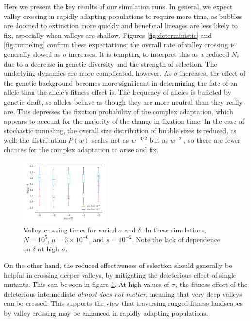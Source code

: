 \documentclass[rmp]{revtex4}
\begin{document}
\begin{spacing}{1.5}
Here we present the key results of our simulation runs.
In general, we expect valley crossing in rapidly adapting populations to require more time, as bubbles are doomed to extinction more quickly and beneficial lineages are less likely to fix, especially when valleys are shallow.
Figures \ref{fig:deterministic} and \ref{fig:tunneling} confirm these expectations: the overall rate of valley crossing is generally slowed as $\sigma$ increases.
It is tempting to interpret this as a reduced $N_e$ due to a decrease in genetic diversity and the strength of selection.
The underlying dynamics are more complicated, however.
As $\sigma$ increases, the effect of the genetic background becomes more significant in determining the fate of an allele than the allele's fitness effect is.
The frequency of alleles is buffeted by genetic draft, so alleles behave as though they are more neutral than they really are.
This depresses the fixation probability of the complex adaptation, which appears to account for the majority of the change in fixation time.
In the case of stochastic tunneling, the overall size distribution of bubble sizes is reduced, as well: the distribution $P(w)$ scales not as $w^{-3/2}$ but as $w^{-2}$ \citep{neher_shraiman_2011}, so there are fewer chances for the complex adaptation to arise and fix.

\begin{figure}
\includegraphics[width=0.4\textwidth]{Figures/var_sigma_delta.pdf}
\caption{Valley crossing times for varied $\sigma$ and $\delta$. In these simulations, $N = 10^5$, $\mu = 3 \times 10^{-6}$, and $s = 10^{-2}$. Note the lack of dependence on $\delta$ at high $\sigma$.}
\label{fig:sigma_delta}
\end{figure}

On the other hand, the reduced effectiveness of selection should generally be helpful in crossing deeper valleys, by mitigating the deleterious effect of single mutants.
This can be seen in figure \ref{fig:sigma_delta}.
At high values of $\sigma$, the fitness effect of the deleterious intermediate \emph{almost does not matter}, meaning that very deep valleys can be crossed.
This supports the view that traversing rugged fitness landscapes by valley crossing may be enhanced in rapidly adapting populations.


\end{spacing}
\end{document}
